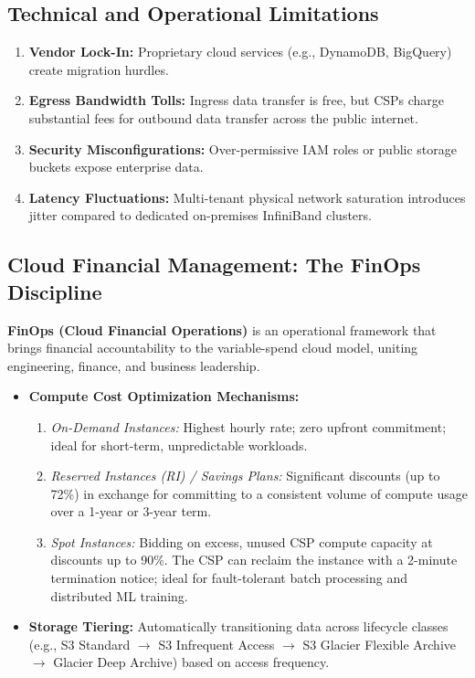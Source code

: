 \subsection{Technical and Operational Limitations}
\begin{enumerate}[label=\alph*.]
    \item \textbf{Vendor Lock-In:} Proprietary cloud services (e.g., DynamoDB, BigQuery) create migration hurdles.
    \item \textbf{Egress Bandwidth Tolls:} Ingress data transfer is free, but CSPs charge substantial fees for outbound data transfer across the public internet.
    \item \textbf{Security Misconfigurations:} Over-permissive IAM roles or public storage buckets expose enterprise data.
    \item \textbf{Latency Fluctuations:} Multi-tenant physical network saturation introduces jitter compared to dedicated on-premises InfiniBand clusters.
\end{enumerate}

\subsection{Cloud Financial Management: The FinOps Discipline}
\textbf{FinOps (Cloud Financial Operations)} is an operational framework that brings financial accountability to the variable-spend cloud model, uniting engineering, finance, and business leadership.
\begin{itemize}
    \item \textbf{Compute Cost Optimization Mechanisms:}
    \begin{enumerate}
        \item \textit{On-Demand Instances:} Highest hourly rate; zero upfront commitment; ideal for short-term, unpredictable workloads.
        \item \textit{Reserved Instances (RI) / Savings Plans:} Significant discounts (up to 72\%) in exchange for committing to a consistent volume of compute usage over a 1-year or 3-year term.
        \item \textit{Spot Instances:} Bidding on excess, unused CSP compute capacity at discounts up to 90\%. The CSP can reclaim the instance with a 2-minute termination notice; ideal for fault-tolerant batch processing and distributed ML training.
    \end{enumerate}
    \item \textbf{Storage Tiering:} Automatically transitioning data across lifecycle classes (e.g., S3 Standard $\rightarrow$ S3 Infrequent Access $\rightarrow$ S3 Glacier Flexible Archive $\rightarrow$ Glacier Deep Archive) based on access frequency.
\end{itemize}



